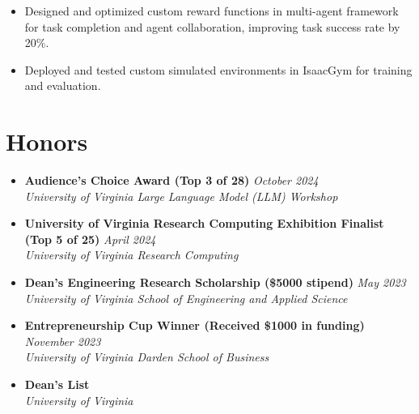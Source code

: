 \documentclass[letterpaper,11pt]{article}
\newcommand{\Date}[1]{\textit{\small #1}}
\newcommand{\heading}[4]{
  \textbf{#1} \hfill #2 \\
  \textit{\small#3} \hfill \Date{#4}
}
\begin{document}
\begin{itemize}[label={}, leftmargin=0pt]
\begin{itemize}
\begin{itemize}
                        \item Designed and optimized custom reward functions in multi-agent framework for task completion and agent collaboration, improving task success rate by 20\%.
                        \item Deployed and tested custom simulated environments in IsaacGym for training and evaluation.
                    \end{itemize}
          \end{itemize}
\end{itemize}

\section{Honors}
\begin{itemize}[label={}, leftmargin=0pt]
    \item \heading{Audience's Choice Award \textnormal{(Top 3 of 28)}}{\Date{October 2024}}{University of Virginia Large Language Model (LLM) Workshop}{}
    \item \heading{University of Virginia Research Computing Exhibition Finalist \textnormal{(Top 5 of 25)}}{\Date{April 2024}}{University of Virginia Research Computing}{}
    \item \heading{Dean's Engineering Research Scholarship \textnormal{(\$5000 stipend)}}{\Date{May 2023}}{University of Virginia School of Engineering and Applied Science}{}
    \item \heading{Entrepreneurship Cup Winner \textnormal{(Received \$1000 in funding)}}{\Date{November 2023}}{University of Virginia Darden School of Business}{}
    \item \heading{Dean's List}{}{University of Virginia}{}
\end{itemize}
\end{document}
